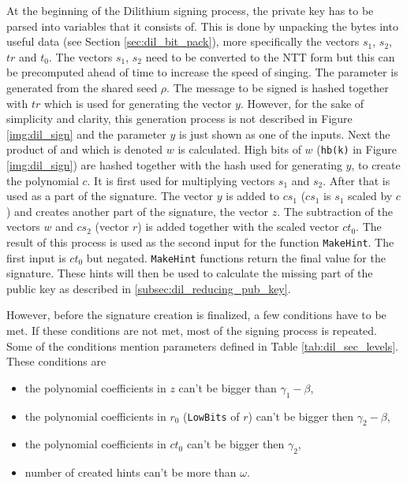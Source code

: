 At the beginning of the Dilithium signing process, the private key has to be parsed into variables that it consists of. This is done by unpacking the bytes into useful data (see Section \ref{sec:dil_bit_pack}), more specifically the vectors $s_1$, $s_2$, $tr$ and $t_0$. The vectors $s_1$, $s_2$ need to be converted to the NTT form but this can be precomputed ahead of time to increase the speed of singing. The parameter  is generated from the shared seed $\rho$. The message to be signed is hashed together with $tr$ which is used for generating the vector $y$. However, for the sake of simplicity and clarity, this generation process is not described in Figure \ref{img:dil_sign} and the parameter $y$ is just shown as one of the inputs. Next the product of  and  which is denoted $w$ is calculated. High bits of $w$ (\texttt{hb(k)} in Figure \ref{img:dil_sign}) are hashed together with the hash used for generating $y$, to create the polynomial $c$. It is first used for multiplying vectors $s_1$ and $s_2$. After that is used as a part of the signature. The vector $y$ is added to $cs_1$ ($cs_1$ is $s_1$ scaled by $c$) and creates another part of the signature, the vector $z$. The subtraction of the vectors $w$ and $cs_2$ (vector $r$) is added together with the scaled vector $ct_0$. The result of this process is used as the second input for the function \texttt{MakeHint}. The first input is $ct_0$ but negated. \texttt{MakeHint} functions return the final value for the signature. These hints will then be used to calculate the missing part of the public key as described in \ref{subsec:dil_reducing_pub_key}.

However, before the signature creation is finalized, a few conditions have to be met. If these conditions are not met, most of the signing process is repeated. Some of the conditions mention parameters defined in Table \ref{tab:dil_sec_levels}. These conditions are
\begin{itemize}
  \item the polynomial coefficients in $z$ can't be bigger than $\gamma_1-\beta$,
  \item the polynomial coefficients in $r_0$ (\texttt{LowBits} of $r$) can't be bigger then $\gamma_2-\beta$,
  \item the polynomial coefficients in $ct_0$ can't be bigger then $\gamma_2$,
  \item number of created hints can't be more than $\omega$.
\end{itemize}
